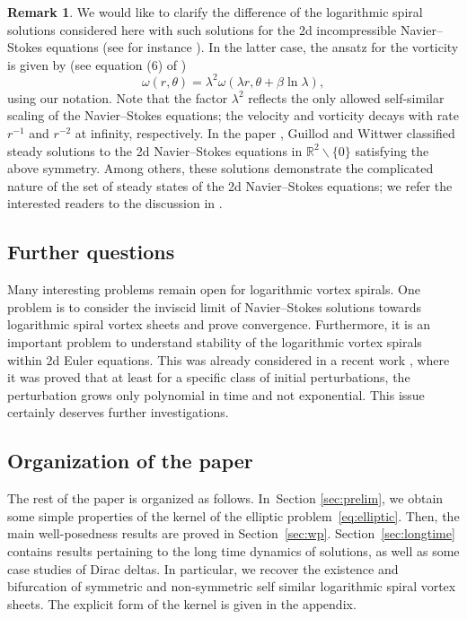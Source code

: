 \documentclass[JEP,XML,SOM,Unicode,NoFloatCountersInSection,published]{cedram}
\theoremstyle{plain}
\theoremstyle{definition}
\newtheorem{remark}[theorem]{Remark}
\let\bt\beta
\let\lmb\lambda
\begin{document}
\begin{remark}
We would like to clarify the difference of the logarithmic spiral solutions considered here with such solutions for the 2d incompressible Navier--Stokes equations (see for instance \cite{GuWi,GuWi2,Sve,Hamel,Landau}). In the latter case, the ansatz for the vorticity is given by (see equation (6) of \cite{GuWi})
\[
\omega(r,\theta)=\lmb^{2} \omega(\lmb r, \theta + \bt \ln \lmb),
\]
using our notation. Note that the factor $\lmb^{2}$ reflects the only allowed self-similar scaling of the Navier--Stokes equations; the velocity and vorticity decays with rate $r^{-1}$ and $r^{-2}$ at infinity, respectively. In the paper \cite{GuWi}, Guillod and Wittwer classified steady solutions to the 2d Navier--Stokes equations in $\mathbb{R}^{2}\backslash \{0\}$ satisfying the above symmetry. Among others, these solutions demonstrate the complicated nature of the set of steady states of the 2d Navier--Stokes equations; we refer the interested readers to the discussion in \cite{GuWi}.
\end{remark}

\subsection{Further questions} Many interesting problems remain open for logarithmic vortex spirals. One problem is to consider the inviscid limit of Navier--Stokes solutions towards logarithmic spiral vortex sheets and prove convergence. Furthermore, it is an important problem to understand stability of the logarithmic vortex spirals within 2d Euler equations. This was already considered in a recent work \cite{CKW24}, where it was proved that at least for a specific class of initial perturbations, the perturbation grows only polynomial in time and not exponential. This issue certainly deserves further investigations.

\subsection{Organization of the paper} The rest of the paper is organized as follows. In~Section \ref{sec:prelim}, we obtain some simple properties of the kernel of the elliptic problem~\eqref{eq:elliptic}. Then, the main well-posedness results are proved in Section~\ref{sec:wp}. Section~\ref{sec:longtime} contains results pertaining to the long time dynamics of solutions, as well as some case studies of Dirac deltas. In particular, we recover the existence and bifurcation of symmetric and non-symmetric self similar logarithmic spiral vortex sheets. The explicit form of the kernel is given in the appendix.
\end{document}
